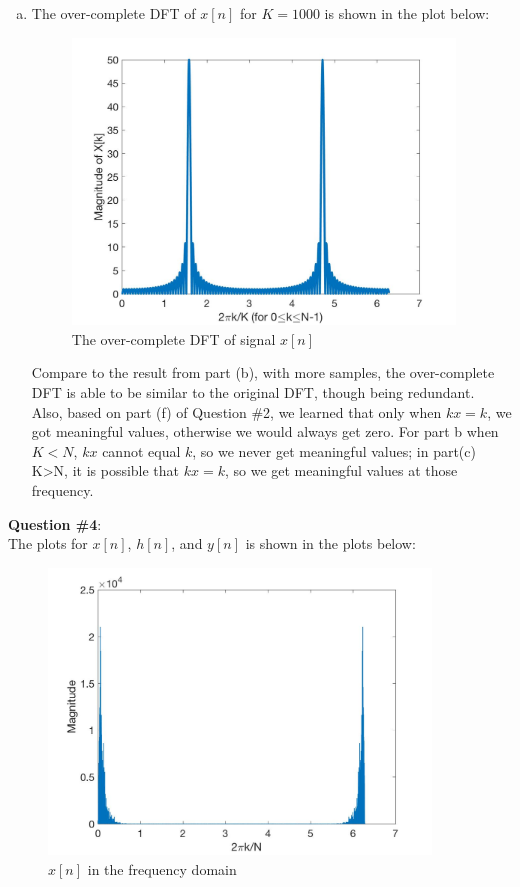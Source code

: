 \documentclass[a4paper]{article}
\begin{document}
\begin{spacing}{2.0}
\begin{enumerate}[(a)]
\item The over-complete DFT of $x[n]$ for $K = 1000$ is shown in the plot below:
\begin{figure}[H]
\centering
\includegraphics[width=4in]{Q3pc.jpg}
\caption{The over-complete DFT of signal $x[n]$}
\end{figure}

Compare to the result from part (b), with more samples, the over-complete DFT is able to be similar to the original DFT, though being redundant.\\
Also, based on part (f) of Question \#2, we learned that only when $kx=k$, we got meaningful values, otherwise we would always get zero. For part b when $K<N$, $kx$ cannot equal $k$, so we never get meaningful values; in part(c) K>N, it is possible that $kx=k$, so we get meaningful values at those frequency.


\end{enumerate}

\Large\textbf{ Question \#4}:  \\
\normalsize
The plots for $x[n]$, $h[n]$, and $y[n]$ is shown in the plots below:
\begin{figure}[H]
\centering
\includegraphics[width=4in]{Q4X.jpg}
\caption{$x[n]$ in the frequency domain}
\label{fig:graph}
\end{figure}


\end{spacing}
\end{document}
